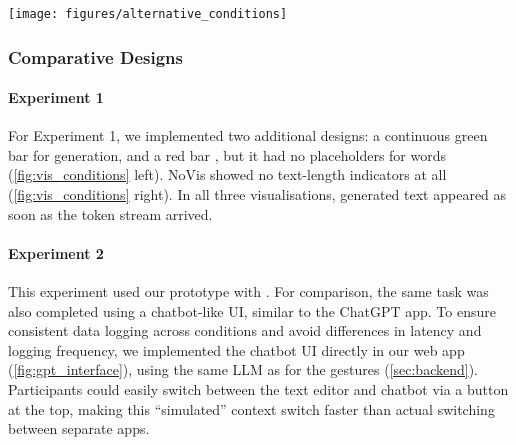 \begin{figure*}[t]
     \centering
     \texttt{[image: figures/alternative\_conditions]}
     \caption{Examples of the UI in Experiment 1: In the \visline{} condition (left) coloured lines provide visual feedback on the change of text length. The design of the \visnone{} condition (right) offered no visual feedback beyond the text itself.}
     \label{fig:vis_conditions}
\end{figure*}

\subsubsection{Comparative Designs} %
\paragraph{Experiment 1}
For Experiment 1, we implemented two additional designs:
\visline{}  a continuous green bar for generation, and a red bar , but it had no placeholders for  words (\cref{fig:vis_conditions} left).
NoVis showed no text-length indicators at all (\cref{fig:vis_conditions} right).
In all three visualisations, generated text appeared as soon as the token stream arrived.


\paragraph{Experiment 2}
This experiment used our prototype with \visbubble.
For comparison, the same task was also completed using a chatbot-like UI, similar to the ChatGPT app.
To ensure consistent data logging across conditions and avoid differences in latency and logging frequency, we implemented the chatbot UI directly in our web app (\cref{fig:gpt_interface}), using the same LLM as for the gestures (\cref{sec:backend}). 
Participants could easily switch between the text editor and chatbot via a button at the top, making this ``simulated'' context switch faster than actual switching between separate apps.


